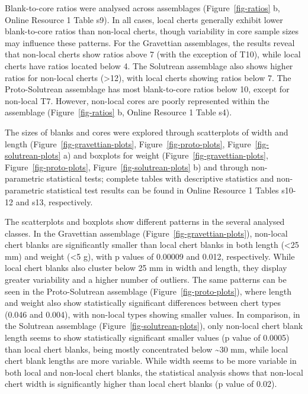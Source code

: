 \documentclass[
  a4paper,
  DIV=11,
  numbers=noendperiod]{scrreprt}
\begin{document}
Blank-to-core ratios were analysed across assemblages
(Figure~\ref{fig-ratios} b, Online Resource 1 Table s9). In all cases,
local cherts generally exhibit lower blank-to-core ratios than non-local
cherts, though variability in core sample sizes may influence these
patterns. For the Gravettian assemblages, the results reveal that
non-local cherts show ratios above 7 (with the exception of T10), while
local cherts have ratios located below 4. The Solutrean assemblage also
shows higher ratios for non-local cherts (\textgreater12), with local
cherts showing ratios below 7. The Proto-Solutrean assemblage has most
blank-to-core ratios below 10, except for non-local T7. However,
non-local cores are poorly represented within the assemblage
(Figure~\ref{fig-ratios} b, Online Resource 1 Table s4).

The sizes of blanks and cores were explored through scatterplots of
width and length (Figure~\ref{fig-gravettian-plots},
Figure~\ref{fig-proto-plots}, Figure~\ref{fig-solutrean-plots} a) and
boxplots for weight (Figure~\ref{fig-gravettian-plots},
Figure~\ref{fig-proto-plots}, Figure~\ref{fig-solutrean-plots} b) and
through non-parametric statistical tests; complete tables with
descriptive statistics and non-parametric statistical test results can
be found in Online Resource 1 Tables s10-12 and s13, respectively.

The scatterplots and boxplots show different patterns in the several
analysed classes. In the Gravettian assemblage
(Figure~\ref{fig-gravettian-plots}), non-local chert blanks are
significantly smaller than local chert blanks in both length
(\textless25 mm) and weight (\textless5 g), with p values of 0.00009 and
0.012, respectively. While local chert blanks also cluster below 25 mm
in width and length, they display greater variability and a higher
number of outliers. The same patterns can be seen in the Proto-Solutrean
assemblage (Figure~\ref{fig-proto-plots}), where length and weight also
show statistically significant differences between chert types (0.046
and 0.004), with non-local types showing smaller values. In comparison,
in the Solutrean assemblage (Figure~\ref{fig-solutrean-plots}), only
non-local chert blank length seems to show statistically significant
smaller values (p value of 0.0005) than local chert blanks, being mostly
concentrated below \textasciitilde30 mm, while local chert blank lengths
are more variable. While width seems to be more variable in both local
and non-local chert blanks, the statistical analysis shows that
non-local chert width is significantly higher than local chert blanks (p
value of 0.02).
\end{document}
